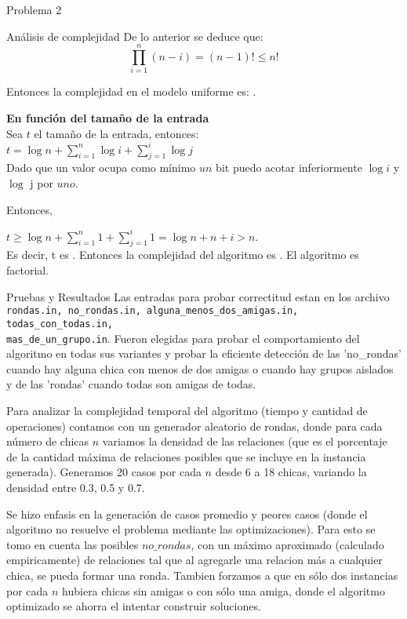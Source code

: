 \begin{section}{Problema 2}
\begin{subsection}{Análisis de complejidad}
			De lo anterior se deduce que: $$\displaystyle\prod_{i=1}^n (n-i) = (n-1)! \leq n!$$

			Entonces la complejidad en el modelo uniforme es:  .\VSP
		
			\noindent\textbf{En función del tamaño de la entrada}\\

				Sea $t$ el tamaño de la entrada, entonces:\\
				
				$t=\log n + \sum_{i=1}^n \log i + \sum_{j=1}^i \log j$\\
				
				Dado que un valor ocupa como mínimo $un$ bit puedo acotar inferiormente $\log i$ y $\log$ j por $uno$.
				
				Entonces,
				
				$t \geq \log n + \sum_{i=1}^n 1 + \sum_{j=1}^i 1=\log n + n + i > n$.\\
				
				
				Es decir, t es . Entonces la complejidad del algoritmo es . El algoritmo es factorial.
	\end{subsection}

	\begin{subsection}{Pruebas y Resultados}
		Las entradas para probar correctitud estan en los archivo \texttt{rondas.in, no\_rondas.in, alguna\_menos\_dos\_amigas.in, todas\_con\_todas.in, \\
		mas\_de\_un\_grupo.in}.
		Fueron elegidas para probar el comportamiento del algoritmo en todas sus variantes y probar la eficiente detección de las 'no\_rondas' cuando hay alguna chica con menos de dos amigas o cuando hay grupos aislados y de las 'rondas' cuando todas son amigas de todas.
		
		Para analizar la complejidad temporal del algoritmo (tiempo y cantidad de operaciones) contamos con un generador aleatorio de rondas, donde para cada número de chicas $n$ variamos la densidad de las relaciones (que es el porcentaje de la cantidad máxima de relaciones posibles que se incluye en la instancia generada). Generamos 20 casos por cada $n$ desde 6 a 18 chicas, variando la densidad entre 0.3, 0.5 y 0.7.

		 Se hizo enfasis en la generación de casos promedio y peores casos (donde el algoritmo no resuelve el problema mediante las optimizaciones). Para esto se tomo en cuenta las posibles $no\_rondas$, con un máximo aproximado (calculado empiricamente) de relaciones tal que al agregarle una relacion más a cualquier chica, se pueda formar una ronda. Tambien forzamos a que en sólo dos instancias por cada $n$ hubiera chicas sin amigas o con sólo una amiga, donde el algoritmo optimizado se ahorra el intentar construir soluciones.
		

\end{subsection}
\end{section}
